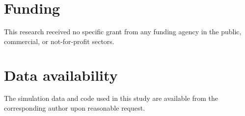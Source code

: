\documentclass[preprint,12pt]{elsarticle}
\begin{document}
\section*{Funding}
This research received no specific grant from any funding agency in the public, commercial, or not-for-profit sectors.

\section*{Data availability}
The simulation data and code used in this study are available from the corresponding author upon reasonable request.



\end{document}
